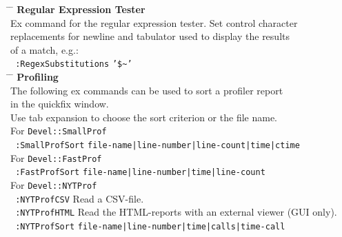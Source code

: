 \documentclass[oneside,10pt,landscape,DIV17]{scrartcl}
\begin{document}
\begin{multicols}{2}
{\begin{tabbing}
%
\hspace{40mm} \= \hspace{50mm} \= \kill
\large{\textbf{Regular Expression Tester}}\\[1.0ex]
%
Ex command for the regular expression tester. Set control character\\
replacements for newline and tabulator used to display the results\\
of a match, e.g.:\\[1.0ex]

\texttt{ :RegexSubstitutions}   \> \texttt{'\$}\texttt{\~}\texttt{'}  \\[2.5ex]
%
\hspace{30mm} \= \hspace{50mm} \= \kill
%
\large{\textbf{Profiling}}\\[1.0ex]
%
The following ex commands can be used to sort a profiler report \\in the quickfix window.\\
Use tab expansion to choose the sort criterion or the file name.\\[2.0ex]
%
For \texttt{Devel::SmallProf}\\[1.0ex]
\texttt{ :SmallProfSort}   \> \texttt{file-name|line-number|line-count|time|ctime}\\[1.0ex]
%
%
For \texttt{Devel::FastProf}\\[1.0ex]
\texttt{ :FastProfSort}    \> \texttt{file-name|line-number|time|line-count}\\[1.0ex]
%
%
For \texttt{Devel::NYTProf}\\[1.0ex]
\texttt{ :NYTProfCSV}      \> Read a CSV-file.\\[1.0ex]
%
\texttt{ :NYTProfHTML}      \> Read the HTML-reports with an external viewer (GUI only).\\[1.0ex]
%
%
\texttt{ :NYTProfSort}     \> \texttt{file-name|line-number|time|calls|time-call}\\
%
\end{tabbing}
}
\end{multicols}%
%
\end{document}
